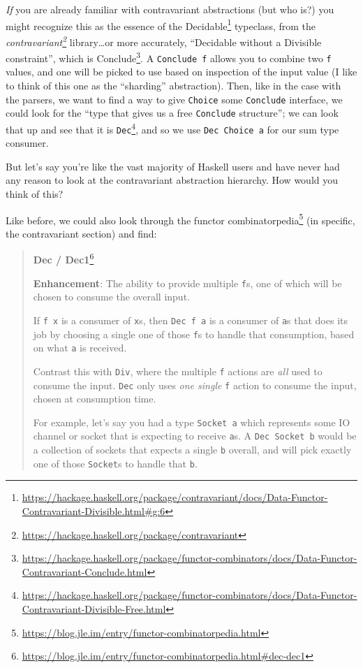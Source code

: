 \documentclass[]{article}
\renewcommand{\href}[2]{#2\footnote{\url{#1}}}
\begin{document}
\emph{If} you are already familiar with contravariant abstractions (but who is?)
you might recognize this as the essence of the
\href{https://hackage.haskell.org/package/contravariant/docs/Data-Functor-Contravariant-Divisible.html\#g:6}{Decidable}
typeclass, from the
\emph{\href{https://hackage.haskell.org/package/contravariant}{contravariant}}
library\ldots or more accurately, ``Decidable without a Divisible constraint'',
which is
\href{https://hackage.haskell.org/package/functor-combinators/docs/Data-Functor-Contravariant-Conclude.html}{Conclude}.
A \texttt{Conclude\ f} allows you to combine two \texttt{f} values, and one will
be picked to use based on inspection of the input value (I like to think of this
one as the ``sharding'' abstraction). Then, like in the case with the parsers,
we want to find a way to give \texttt{Choice} some \texttt{Conclude} interface,
we could look for the ``type that gives us a free \texttt{Conclude} structure'';
we can look that up and see that it is
\href{https://hackage.haskell.org/package/functor-combinators/docs/Data-Functor-Contravariant-Divisible-Free.html}{\texttt{Dec}},
and so we use \texttt{Dec\ Choice\ a} for our sum type consumer.

But let's say you're like the vast majority of Haskell users and have never had
any reason to look at the contravariant abstraction hierarchy. How would you
think of this?

Like before, we could also look through the
\href{https://blog.jle.im/entry/functor-combinatorpedia.html}{functor
combinatorpedia} (in specific, the contravariant section) and find:

\begin{quote}
\href{https://blog.jle.im/entry/functor-combinatorpedia.html\#dec-dec1}{\textbf{Dec
/ Dec1}}

\textbf{Enhancement}: The ability to provide multiple \texttt{f}s, one of which
will be chosen to consume the overall input.

If \texttt{f\ x} is a consumer of \texttt{x}s, then \texttt{Dec\ f\ a} is a
consumer of \texttt{a}s that does its job by choosing a single one of those
\texttt{f}s to handle that consumption, based on what \texttt{a} is received.

Contrast this with \texttt{Div}, where the multiple \texttt{f} actions are
\emph{all} used to consume the input. \texttt{Dec} only uses \emph{one single}
\texttt{f} action to consume the input, chosen at consumption time.

For example, let's say you had a type \texttt{Socket\ a} which represents some
IO channel or socket that is expecting to receive \texttt{a}s. A
\texttt{Dec\ Socket\ b} would be a collection of sockets that expects a single
\texttt{b} overall, and will pick exactly one of those \texttt{Socket}s to
handle that \texttt{b}.
\end{quote}
\end{document}
